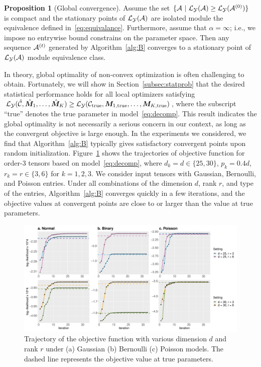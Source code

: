 \documentclass[12pt]{article}
\theoremstyle{definition}
\newtheorem{prop}{Proposition}[section]
\theoremstyle{definition}
\begin{document}
\begin{prop}[Global convergence]\label{prop:alg}
Assume the set $\{\mathcal{A}\ |\ \mathcal{L}_{\mathcal{Y}}(\mathcal{A}) \geq \mathcal{L}_{\mathcal{Y}}(\mathcal{A}^{(0)}) \}$ is compact and the stationary points of $\mathcal{L}_{\mathcal{Y}}(\mathcal{A})$ are isolated module the equivalence defined in~\eqref{eq:equivalance}. Furthermore, assume that $\alpha = \infty$; i.e., we impose no entrywise bound constrains on the parameter space. Then any sequence $\mathcal{A}^{(t)}$ generated by Algorithm~\ref{alg:B} converges to a stationary point of $\mathcal{L}_{\mathcal{Y}}(\mathcal{A})$ module equivalence class.
\end{prop}


In theory, global optimality of non-convex optimization is often challenging to obtain. Fortunately, we will show in Section~\ref{subsec:statprob} that the desired statistical performance holds for all local optimizers satisfying $\mathcal{L}_{\mathcal{Y}}(\hat {\mathcal{C}}, \hat {\bm M}_1,\ldots,\hat {\bm M}_K)\geq \mathcal{L}_{\mathcal{Y}} (\mathcal{C}_{\textup{true}},\bm M_{1,\textup{true}},\ldots,\bm M_{K,\textup{true}})$, where the subscript ``true'' denotes the true parameter in model~\eqref{eq:decomp}. This result indicates the global optimality is not necessarily a serious concern in our context, as long as the convergent objective is large enough. In the experiments we considered, we find that Algorithm~\ref{alg:B} typically gives satisfactory convergent points upon random initialization. Figure~\ref{fig:loglike} shows the trajectories of objective function for order-3 tensors based on model~\eqref{eq:decomp}, where $d_k = d \in\{25,30\}$, $p_k = 0.4d$, $r_k = r\in\{3,6\}$ for $ k = 1,2,3$. We consider input tensors with Gaussian, Bernoulli, and Poisson entries. Under all combinations of the dimension $d$, rank $r$, and type of the entries, Algorithm~\ref{alg:B} converges quickly in a few iterations, and the objective values at convergent points are close to or larger than the value at true parameters.  

\begin{figure}[t]
\centering
\includegraphics[width=16cm]{loglike.pdf}
\caption{Trajectory of the objective function with various dimension $d$ and rank $r$ under (a) Gaussian (b) Bernoulli (c) Poisson models. The dashed line represents the objective value at true parameters. }\label{fig:loglike}
\end{figure}
\end{document}
